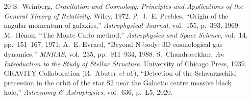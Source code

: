 \documentclass[10pt,twocolumn,letterpaper]{article}
\begin{document}
\begin{thebibliography}{20}
 S.~Weinberg, \emph{Gravitation and Cosmology: Principles and Applications of the General Theory of Relativity}. Wiley, 1972.
 P.~J.~E. Peebles, ``Origin of the angular momentum of galaxies,'' \emph{Astrophysical Journal}, vol.~155, p.~393, 1969.
 M.~H\'{e}non, ``The Monte Carlo method,'' \emph{Astrophysics and Space Science}, vol.~14, pp.~151--167, 1971.
 A.~E. Evrard, ``Beyond N-body: 3D cosmological gas dynamics,'' \emph{MNRAS}, vol.~235, pp.~911--934, 1988.
 S.~Chandrasekhar, \emph{An Introduction to the Study of Stellar Structure}. University of Chicago Press, 1939.
 GRAVITY Collaboration (R.~Abuter \emph{et al.}), ``Detection of the Schwarzschild precession in the orbit of the star S2 near the Galactic centre massive black hole,'' \emph{Astronomy \& Astrophysics}, vol.~636, p.~L5, 2020.
\end{thebibliography}
\end{document}
